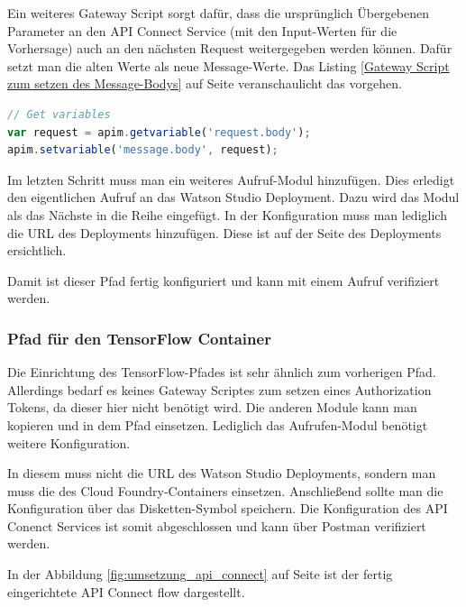 Ein weiteres Gateway Script sorgt dafür, dass die ursprünglich Übergebenen Parameter an den API Connect Service (mit den
Input-Werten für die Vorhersage) auch an den nächsten Request weitergegeben werden können. Dafür setzt man die alten Werte
als neue Message-Werte. Das Listing \ref{Gateway Script zum setzen des Message-Bodys} auf Seite
\pageref{Gateway Script zum setzen des Message-Bodys} veranschaulicht das vorgehen.

\begin{lstlisting}[language=javascript, caption=Gateway Script zum setzen des Message-Bodys, label=Gateway Script zum setzen des Message-Bodys]
// Get variables
var request = apim.getvariable('request.body');
apim.setvariable('message.body', request);
\end{lstlisting}

Im letzten Schritt muss man ein weiteres Aufruf-Modul hinzufügen. Dies erledigt den eigentlichen Aufruf an das Watson
Studio Deployment. Dazu wird das Modul als das Nächste in die Reihe eingefügt. In der Konfiguration muss man lediglich
die URL des Deployments hinzufügen. Diese ist auf der Seite des Deployments ersichtlich.

Damit ist dieser Pfad fertig konfiguriert und kann mit einem Aufruf verifiziert werden.

\subsubsection*{Pfad für den TensorFlow Container}
Die Einrichtung des TensorFlow-Pfades ist sehr ähnlich zum vorherigen Pfad. Allerdings bedarf es keines Gateway Scriptes
zum setzen eines Authorization Tokens, da dieser hier nicht benötigt wird. Die anderen Module kann man kopieren und in
dem Pfad einsetzen. Lediglich das Aufrufen-Modul benötigt weitere Konfiguration.

In diesem muss nicht die URL des Watson Studio Deployments, sondern man muss die des Cloud Foundry-Containers einsetzen.
Anschließend sollte man die Konfiguration über das Disketten-Symbol speichern. Die Konfiguration des API Conenct Services
ist somit abgeschlossen und kann über Postman verifiziert werden.

In der Abbildung \ref{fig:umsetzung_api_connect} auf Seite \pageref{fig:umsetzung_api_connect} ist der fertig
eingerichtete API Connect flow dargestellt.

